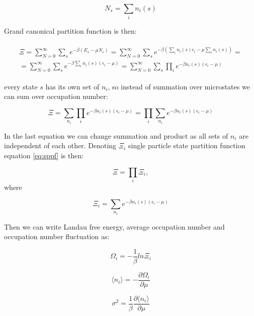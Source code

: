 \documentclass[10pt]{article}
\begin{document}
\begin{equation}
N_s = \sum_i n_i(s)
\end{equation}

Grand canonical partition function is then:

\begin{align}
\begin{split}
\Xi = \sum_{N=0}^{\infty} \sum_s e^{-\beta(E_s - \mu N_s)} = \sum_{N=0}^{\infty} \sum_s e^{-\beta(\sum_i n_i(s)\epsilon_i - \mu \sum_i n_i(s))} =\\
= \sum_{N=0}^{\infty} \sum_s e^{-\beta\sum_i n_i(s)(\epsilon_i - \mu)} = \sum_{N=0}^{\infty} \sum_s \prod_i e^{-\beta n_i(s)(\epsilon_i - \mu)}
\end{split}
\end{align}

every state $s$ has its own set of $n_i$, so instead of summation over microstates we can sum over occupation number:

\begin{equation}\label{eq:sppf}
\Xi = \sum_{n_i} \prod_i e^{-\beta n_i(s)(\epsilon_i - \mu)} = \prod_i \sum_{n_i}  e^{-\beta n_i(s)(\epsilon_i - \mu)}
\end{equation}

In the last equation we can change summation and product as all sets of $n_i$ are independent of each other.
Denoting $\Xi_i$ single particle state partition function equation \ref{eq:sppf} is then:

\begin{equation}
\Xi = \prod_i \Xi_i,
\end{equation}
where

\begin{equation}\label{allll1}
\Xi_i = \sum_{n_i}  e^{-\beta n_i(s)(\epsilon_i - \mu)}
\end{equation}

Then we can write Landau free energy, average occupation number and occupation number fluctuation as:

\begin{equation}
\Omega_i = -\frac{1}{\beta}ln\Xi_i
\end{equation}


\begin{equation}
\langle n_i \rangle = -\frac{\partial \Omega_i}{\partial \mu}
\end{equation}

\begin{equation}\label{allll2}
\sigma^2 = \frac{1}{\beta} \frac{\partial \langle n_i \rangle}{\partial \mu}
\end{equation}
\end{document}
